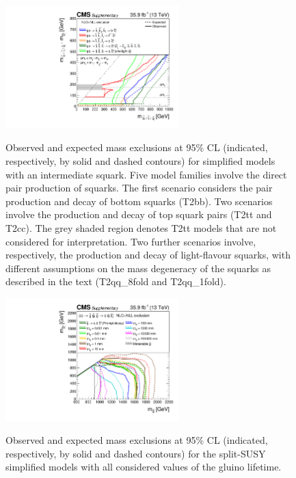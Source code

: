 \clearpage
\begin{figure}[!t]
  \centering
  \includegraphics[width=0.6\textwidth]{Supplementary/squarkZoomSUMMARY_transpose}\\
  \caption{Observed and expected mass exclusions at 95\% CL
    (indicated, respectively, by solid and dashed contours) for
    simplified models with an intermediate squark.
    Five model families involve the direct pair
    production of squarks. The first scenario considers the pair
    production and decay of bottom squarks (T2bb). Two
    scenarios involve the production and decay of top squark pairs
    (T2tt and T2cc). The grey shaded region denotes
    T2tt models that are not considered for
    interpretation. Two further scenarios involve, respectively, the 
    production and decay of light-flavour squarks, with different
    assumptions on the mass degeneracy of the squarks as described in
    the text (T2qq\_8fold and T2qq\_1fold).}
  \label{fig:limits-sms_aux_squarks} 
\end{figure}

\begin{figure}[!t]
  \centering
  \includegraphics[width=0.6\textwidth]{Supplementary/splitAllSUMMARY}\\
  \caption{Observed and expected mass exclusions at 95\% CL
    (indicated, respectively, by solid and dashed contours) for
    the split-SUSY simplified models with all considered values of the gluino lifetime.}
  \label{fig:limits-sms_aux_long_lived} 
\end{figure}
